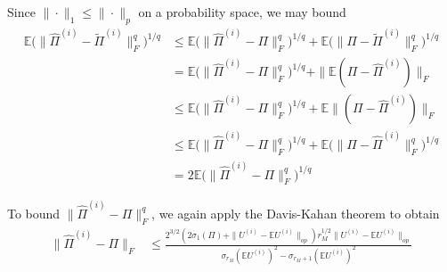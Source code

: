 \documentclass[notheorems]{beamer}
\theoremstyle{definition}
\begin{document}
\begin{frame}
Since $\|\cdot\|_1 \leq \|\cdot \|_p$ on a probability space, we may bound 
\begin{align*}
    \mathbb{E} \bigg( \|\hat{\Pi}^{(i)} - \tilde{\Pi}^{(i)}\|_F^q \bigg)^{1/q}
    & \leq \mathbb{E} \bigg( \|\hat{\Pi}^{(i)} - \Pi \|_F^q \bigg)^{1/q}+ \mathbb{E} \bigg(\| \Pi - \tilde{\Pi}^{(i)}\|_F^q \bigg)^{1/q} \\
    & = \mathbb{E} \bigg( \|\hat{\Pi}^{(i)} - \Pi \|_F^q \bigg)^{1/q}+ \| \mathbb{E} (\Pi - \hat{\Pi}^{(i)})\|_F  \\
    & \leq \mathbb{E} \bigg( \|\hat{\Pi}^{(i)} - \Pi \|_F^q \bigg)^{1/q}+   \mathbb{E}\|(\Pi - \hat{\Pi}^{(i)})\|_F \\
    & \leq \mathbb{E} \bigg( \|\hat{\Pi}^{(i)} - \Pi \|_F^q \bigg)^{1/q}+   \mathbb{E}\bigg(\|\Pi - \hat{\Pi}^{(i)}\|_F^q \bigg)^{1/q}\\
    & = 2 \mathbb{E} \bigg( \|\hat{\Pi}^{(i)} - \Pi \|_F^q \bigg)^{1/q}
\end{align*}
\end{frame}


















\begin{frame}
To bound $\|\hat{\Pi}^{(i)} - \Pi \|_F^q$, we again apply the Davis-Kahan theorem to obtain 
\begin{align}
    \|\hat{\Pi}^{(i)} - \Pi \|_F
    & \leq \frac{2^{3/2}(2 \sigma_1(\Pi) +  \|U^{(i)} - \mathbb{E}U^{(i)}\|_{op}) r_M^{1/2}\|U^{(i)} - \mathbb{E}U^{(i)}\|_{op}}{\sigma_{r_M}(\mathbb{E}U^{(i)})^2 - \sigma_{r_M + 1}(\mathbb{E}U^{(i)})^2} 
\end{align}
\end{frame}
\end{document}
